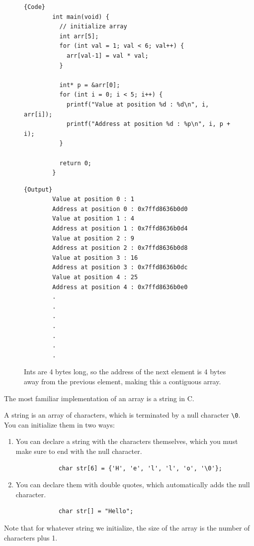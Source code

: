 \documentclass{article}
\begin{document}
    \begin{figure}[H]
      \centering 
      \noindent\begin{minipage}{.5\textwidth}
      \begin{lstlisting}[]{Code}
        int main(void) {
          // initialize array 
          int arr[5]; 
          for (int val = 1; val < 6; val++) {
            arr[val-1] = val * val;
          }

          int* p = &arr[0]; 
          for (int i = 0; i < 5; i++) {
            printf("Value at position %d : %d\n", i, arr[i]); 
            printf("Address at position %d : %p\n", i, p + i); 
          }

          return 0; 
        }        
      \end{lstlisting}
      \end{minipage}
      \hfill
      \begin{minipage}{.49\textwidth}
      \begin{lstlisting}[]{Output}
        Value at position 0 : 1
        Address at position 0 : 0x7ffd8636b0d0
        Value at position 1 : 4
        Address at position 1 : 0x7ffd8636b0d4
        Value at position 2 : 9
        Address at position 2 : 0x7ffd8636b0d8
        Value at position 3 : 16
        Address at position 3 : 0x7ffd8636b0dc
        Value at position 4 : 25
        Address at position 4 : 0x7ffd8636b0e0
        .
        .
        .
        .
        .
        .
        .
      \end{lstlisting}
      \end{minipage}
      \caption{Ints are 4 bytes long, so the address of the next element is 4 bytes away from the previous element, making this a contiguous array.} 
      \label{fig:contiguous_array}
    \end{figure}

    The most familiar implementation of an array is a string in C. 

    \begin{definition}[String]
      A string is an array of characters, which is terminated by a null character \texttt{\textbackslash 0}. You can initialize them in two ways: 
      \begin{enumerate}
        \item You can declare a string with the characters themselves, which you must make sure to end with the null character. 
          \begin{lstlisting} 
            char str[6] = {'H', 'e', 'l', 'l', 'o', '\0'}; 
          \end{lstlisting}
        \item You can declare them with double quotes, which automatically adds the null character. 
          \begin{lstlisting} 
            char str[] = "Hello"; 
          \end{lstlisting}
      \end{enumerate}
      Note that for whatever string we initialize, the size of the array is the number of characters plus 1. 
    \end{definition}
\end{document}
